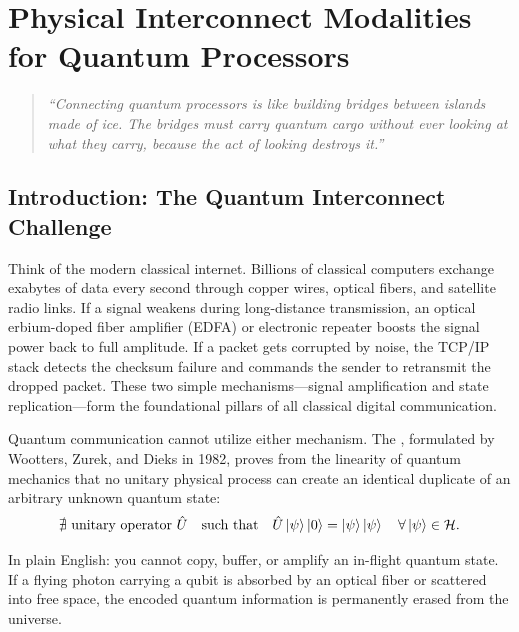 \chapter{Physical Interconnect Modalities for Quantum Processors}
\label{ch:hardware_interconnects}

\begin{quote}
\textit{``Connecting quantum processors is like building bridges between islands made of ice. The bridges must carry quantum cargo without ever looking at what they carry, because the act of looking destroys it.''}
\end{quote}


\section{Introduction: The Quantum Interconnect Challenge}

Think of the modern classical internet. Billions of classical computers exchange exabytes of data every second through copper wires, optical fibers, and satellite radio links. If a signal weakens during long-distance transmission, an optical erbium-doped fiber amplifier (EDFA) or electronic repeater boosts the signal power back to full amplitude. If a packet gets corrupted by noise, the TCP/IP stack detects the checksum failure and commands the sender to retransmit the dropped packet. These two simple mechanisms---signal amplification and state replication---form the foundational pillars of all classical digital communication.

Quantum communication cannot utilize either mechanism. The , formulated by Wootters, Zurek, and Dieks in 1982, proves from the linearity of quantum mechanics that no unitary physical process can create an identical duplicate of an arbitrary unknown quantum state:
\begin{equation}
    \nexists \text{ unitary operator } \hat{U} \quad \text{such that} \quad \hat{U} \ket{\psi}\ket{0} = \ket{\psi}\ket{\psi} \quad \forall \ket{\psi} \in \mathcal{H}.
    \label{eq:no_cloning_ch2_full}
\end{equation}

In plain English: you cannot copy, buffer, or amplify an in-flight quantum state. If a flying photon carrying a qubit is absorbed by an optical fiber or scattered into free space, the encoded quantum information is permanently erased from the universe.


